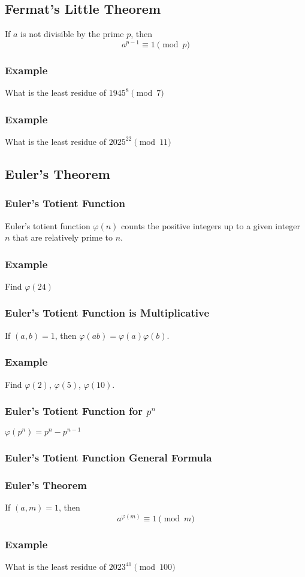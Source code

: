 \documentclass{article}
\begin{document}
\subsection{Fermat's Little Theorem}
If $a$ is not divisible by the prime $p$, then 
$$a^{p-1} \equiv 1 \pmod{p}$$

\subsubsection{Example}
What is the least residue of $1945^8 \pmod{7}$
\vspace{30px}
\subsubsection{Example}
What is the least residue of $2025^{22} \pmod{11}$
\vspace{30px}


\subsection{Euler's Theorem}
\subsubsection{Euler's Totient Function}
Euler's totient function $ \varphi(n)$ counts the positive integers up to a given integer $n$ that are relatively prime to $n$.

\subsubsection{Example}
Find $ \varphi(24)$
\vspace{30px}
\subsubsection{Euler's Totient Function is Multiplicative}
If $(a,b)=1$, then $\varphi(ab)=\varphi(a)\varphi(b)$.

\subsubsection{Example}
Find $ \varphi(2)$, $ \varphi(5)$, $ \varphi(10)$.
\vspace{40px}
\subsubsection{Euler's Totient Function for $p^n$}
$ \varphi(p^n)=p^n-p^{n-1}$
\vspace{30px}
\subsubsection{Euler's Totient Function General Formula}
\vspace{50px}
\subsubsection{Euler's Theorem}
If $(a,m)=1$, then 
$$a^{\varphi(m)} \equiv 1 \pmod{m}$$
\subsubsection{Example}
What is the least residue of $2023^{41} \pmod{100}$
\end{document}
